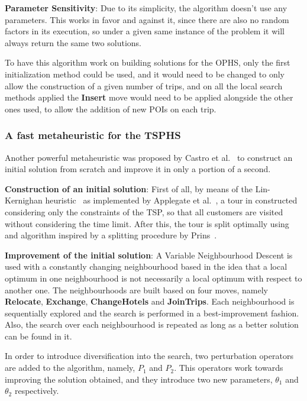     \textbf{Parameter Sensitivity}: Due to its simplicity, the algorithm doesn't use any parameters. This works in favor and against it, since there are also no random factors in its execution, so under a given same instance of the problem it will always return the same two solutions.
    
    To have this algorithm work on building solutions for the OPHS, only the first initialization method could be used, and it would need to be changed to only allow the construction of a given number of trips, and on all the local search methods applied the \textbf{Insert} move would need to be applied alongside the other ones used, to allow the addition of new POIs on each trip.

\subsubsection{A fast metaheuristic for the TSPHS}

    Another powerful metaheuristic was proposed by Castro et al.~\cite{castro2014} to construct an initial solution from scratch and improve it in only a portion of a second.
    
    \textbf{Construction of an initial solution}: First of all, by means of the Lin-Kernighan heuristic~\cite{lin1973} as implemented by Applegate et al.~\cite{applegate2006}, a tour in constructed considering only the constraints of the TSP, so that all customers are visited without considering the time limit. After this, the tour is split optimally using and algorithm inspired by a splitting procedure by Prins~\cite{prins2004}.
    
    \textbf{Improvement of the initial solution}: A Variable Neighbourhood Descent is used with a constantly changing neighbourhood based in the idea that a local optimum in one neighbourhood is not necessarily a local optimum with respect to another one. The neighbourhoods are built based on four moves, namely \textbf{Relocate}, \textbf{Exchange}, \textbf{ChangeHotels} and \textbf{JoinTrips}. Each neighbourhood is sequentially explored and the search is performed in a best-improvement fashion. Also, the search over each neighbourhood is repeated as long as a better solution can be found in it.
    
    In order to introduce diversification into the search, two perturbation operators are added to the algorithm, namely, $P_1$ and $P_2$. This operators work towards improving the solution obtained, and they introduce two new parameters, $\theta_1$ and $\theta_2$ respectively.
    
